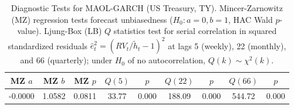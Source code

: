 \begin{table}[H]
\centering
\caption{Diagnostic Tests for MAOL-GARCH (US Treasury, TY). Mincer-Zarnowitz (MZ) regression tests forecast unbiasedness ($H_0: a=0, b=1$, HAC Wald $p$-value). Ljung-Box (LB) $Q$ statistics test for serial correlation in squared standardized residuals $\hat{e}_t^2 = (RV_t/\tilde{h}_t - 1)^2$ at lags 5 (weekly), 22 (monthly), and 66 (quarterly); under $H_0$ of no autocorrelation, $Q(k) \sim \chi^2(k)$.}
\label{tab:diagnostics}
\small
\begin{tabular}{ccccccccc}
\toprule
MZ $a$ & MZ $b$ & MZ $p$ & $Q(5)$ & $p$ & $Q(22)$ & $p$ & $Q(66)$ & $p$ \\
\midrule
-0.0000 & 1.0582 & 0.0811 & 33.77 & 0.000 & 188.09 & 0.000 & 544.72 & 0.000 \\
\bottomrule
\end{tabular}
\end{table}

